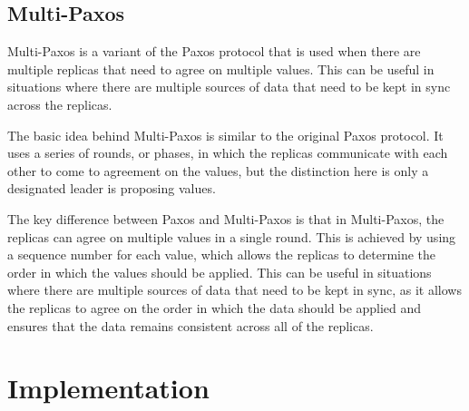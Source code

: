\documentclass[sigconf]{acmart}
\begin{document}
\subsection{Multi-Paxos}

Multi-Paxos is a variant of the Paxos protocol that is used when there are multiple replicas that need to agree on multiple values. This can be useful in situations where there are multiple sources of data that need to be kept in sync across the replicas.

The basic idea behind Multi-Paxos is similar to the original Paxos protocol. It uses a series of rounds, or phases, in which the replicas communicate with each other to come to agreement on the values, but the distinction here is only a designated leader is proposing values.

The key difference between Paxos and Multi-Paxos is that in Multi-Paxos, the replicas can agree on multiple values in a single round. This is achieved by using a sequence number for each value, which allows the replicas to determine the order in which the values should be applied. This can be useful in situations where there are multiple sources of data that need to be kept in sync, as it allows the replicas to agree on the order in which the data should be applied and ensures that the data remains consistent across all of the replicas.

\section{Implementation}






\end{document}
